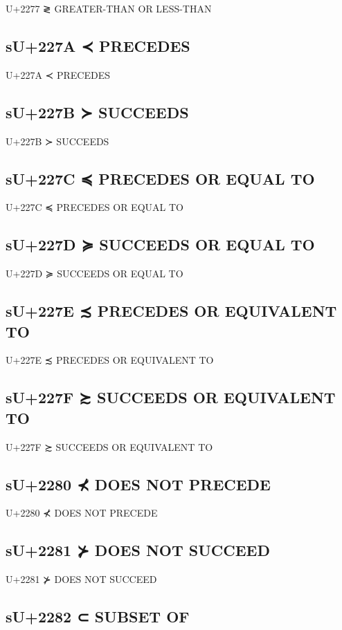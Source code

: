 U+2277 ≷ GREATER-THAN OR LESS-THAN

\subsection{sU+227A ≺ PRECEDES}

U+227A ≺ PRECEDES

\subsection{sU+227B ≻ SUCCEEDS}

U+227B ≻ SUCCEEDS

\subsection{sU+227C ≼ PRECEDES OR EQUAL TO}

U+227C ≼ PRECEDES OR EQUAL TO

\subsection{sU+227D ≽ SUCCEEDS OR EQUAL TO}

U+227D ≽ SUCCEEDS OR EQUAL TO

\subsection{sU+227E ≾ PRECEDES OR EQUIVALENT TO}

U+227E ≾ PRECEDES OR EQUIVALENT TO

\subsection{sU+227F ≿ SUCCEEDS OR EQUIVALENT TO}

U+227F ≿ SUCCEEDS OR EQUIVALENT TO

\subsection{sU+2280 ⊀ DOES NOT PRECEDE}

U+2280 ⊀ DOES NOT PRECEDE

\subsection{sU+2281 ⊁ DOES NOT SUCCEED}

U+2281 ⊁ DOES NOT SUCCEED

\subsection{sU+2282 ⊂ SUBSET OF}

